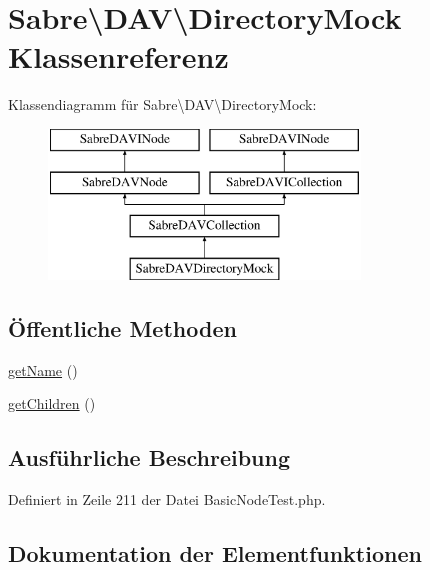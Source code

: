 \hypertarget{class_sabre_1_1_d_a_v_1_1_directory_mock}{}\section{Sabre\textbackslash{}D\+AV\textbackslash{}Directory\+Mock Klassenreferenz}
\label{class_sabre_1_1_d_a_v_1_1_directory_mock}
Klassendiagramm für Sabre\textbackslash{}D\+AV\textbackslash{}Directory\+Mock\+:\begin{figure}[H]
\begin{center}
\leavevmode
\includegraphics[height=4.000000cm]{class_sabre_1_1_d_a_v_1_1_directory_mock}
\end{center}
\end{figure}
\subsection*{Öffentliche Methoden}
\begin{DoxyCompactItemize}
\item 
\mbox{\hyperlink{class_sabre_1_1_d_a_v_1_1_directory_mock_af234ab67cb7373a91e5f6f00ba3fd502}{get\+Name}} ()
\item 
\mbox{\hyperlink{class_sabre_1_1_d_a_v_1_1_directory_mock_a82552ec5014fe8fa6c33521bb5c17cef}{get\+Children}} ()
\end{DoxyCompactItemize}


\subsection{Ausführliche Beschreibung}


Definiert in Zeile 211 der Datei Basic\+Node\+Test.\+php.



\subsection{Dokumentation der Elementfunktionen}
\mbox{\label{class_sabre_1_1_d_a_v_1_1_directory_mock_a82552ec5014fe8fa6c33521bb5c17cef}} 
